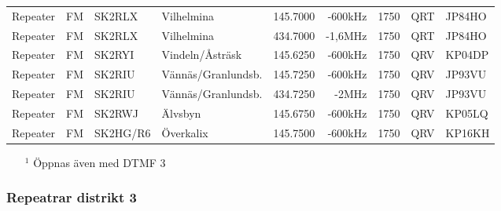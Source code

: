 \begin{longtable}{llllrrlcl}
Repeater & FM     & SK2RLX    & Vilhelmina         & 145.7000 & -600kHz & 1750             & QRT  & JP84HO \\
Repeater & FM     & SK2RLX    & Vilhelmina         & 434.7000 & -1,6MHz & 1750             & QRT  & JP84HO \\
Repeater & FM     & SK2RYI    & Vindeln/Åsträsk    & 145.6250 & -600kHz & 1750             & QRV  & KP04DP \\
Repeater & FM     & SK2RIU    & Vännäs/Granlundsb. & 145.7250 & -600kHz & 1750             & QRV  & JP93VU \\
Repeater & FM     & SK2RIU    & Vännäs/Granlundsb. & 434.7250 & -2MHz   & 1750             & QRV  & JP93VU \\
Repeater & FM     & SK2RWJ    & Älvsbyn            & 145.6750 & -600kHz & 1750             & QRV  & KP05LQ \\
Repeater & FM     & SK2HG/R6  & Överkalix          & 145.7500 & -600kHz & 1750             & QRV  & KP16KH

\end{longtable}
\begin{itemize}
	\item[$^1$] Öppnas även med DTMF 3
\end{itemize}

\subsubsection{Repeatrar distrikt 3}

